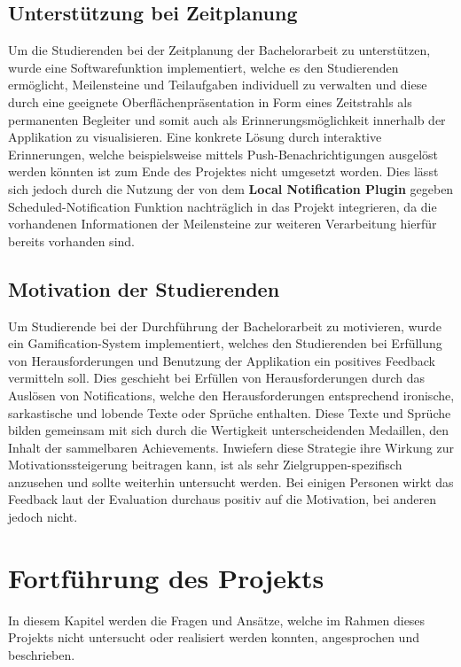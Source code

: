 \documentclass[bibliography=totoc,listof=totoc,BCOR=5mm,DIV=12,oneside]{scrbook}
\begin{document}
\subsection{Unterstützung bei Zeitplanung}
\par Um die Studierenden bei der Zeitplanung der Bachelorarbeit zu unterstützen, wurde eine Softwarefunktion implementiert, welche es den Studierenden ermöglicht, Meilensteine und Teilaufgaben individuell zu verwalten und diese durch eine geeignete Oberflächenpräsentation in Form eines Zeitstrahls als permanenten Begleiter und somit auch als Erinnerungsmöglichkeit innerhalb der Applikation zu visualisieren. Eine konkrete Lösung durch interaktive Erinnerungen, welche beispielsweise mittels Push-Benachrichtigungen ausgelöst werden könnten ist zum Ende des Projektes nicht umgesetzt worden. Dies lässt sich jedoch durch die Nutzung der von dem \textbf{Local Notification Plugin} gegeben Scheduled-Notification Funktion nachträglich in das Projekt integrieren, da die vorhandenen Informationen der Meilensteine zur weiteren Verarbeitung hierfür bereits vorhanden sind. 

\subsection{Motivation der Studierenden}
\par Um Studierende bei der Durchführung der Bachelorarbeit zu motivieren, wurde ein Gamification-System implementiert, welches den Studierenden bei Erfüllung von Herausforderungen und Benutzung der Applikation ein positives Feedback vermitteln soll. Dies geschieht bei Erfüllen von Herausforderungen durch das Auslösen von Notifications, welche den Herausforderungen entsprechend ironische, sarkastische und lobende Texte oder Sprüche enthalten. Diese Texte und Sprüche bilden gemeinsam mit sich durch die Wertigkeit unterscheidenden Medaillen, den Inhalt der sammelbaren Achievements. Inwiefern diese Strategie ihre Wirkung zur Motivationssteigerung beitragen kann, ist als sehr Zielgruppen-spezifisch anzusehen und sollte weiterhin untersucht werden. Bei einigen Personen wirkt das Feedback laut der Evaluation durchaus positiv auf die Motivation, bei anderen jedoch nicht.

\section{Fortführung des Projekts}
\par In diesem Kapitel werden die Fragen und Ansätze, welche im Rahmen dieses Projekts nicht untersucht oder realisiert werden konnten, angesprochen und beschrieben.
\end{document}
